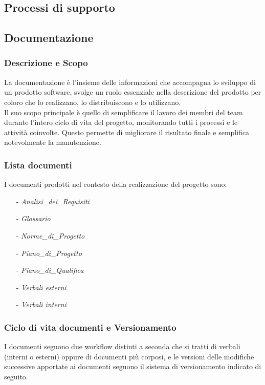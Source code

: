 \documentclass[10pt]{article}
\begin{document}
\begin{justify}
\newpage
\section{Processi di supporto}
    \subsection{Documentazione}

    \subsubsection{Descrizione e Scopo}
    La documentazione è l'insieme delle informazioni che accompagna lo sviluppo di un prodotto software, svolge un ruolo essenziale nella descrizione del prodotto per coloro che lo realizzano, lo distribuiscono e lo utilizzano.\\
    Il suo scopo principale è quello di semplificare il lavoro dei membri del team durante l'intero ciclo di vita del progetto, monitorando tutti i processi e le attività coinvolte. Questo permette di migliorare il risultato finale e semplifica notevolmente la manutenzione.

    \subsubsection{Lista documenti}
    I documenti prodotti nel contesto della realizzazione del progetto sono:
    \begin{itemize}
        \item [-] \textit{Analisi\_dei\_Requisiti}
        \item [-] \textit{Glossario}
        \item [-] \textit{Norme\_di\_Progetto}
        \item [-] \textit{Piano\_di\_Progetto}
        \item [-] \textit{Piano\_di\_Qualifica}
        \item [-] \textit{Verbali esterni}
        \item [-] \textit{Verbali interni}
    \end{itemize}

    \subsubsection{Ciclo di vita documenti e Versionamento}
    I documenti seguono due workflow distinti a seconda che si tratti di verbali (interni o esterni) oppure di documenti più corposi, e le versioni delle modifiche successive apportate ai documenti seguono il sistema di versionamento indicato di seguito.\\


\end{justify}
\end{document}
